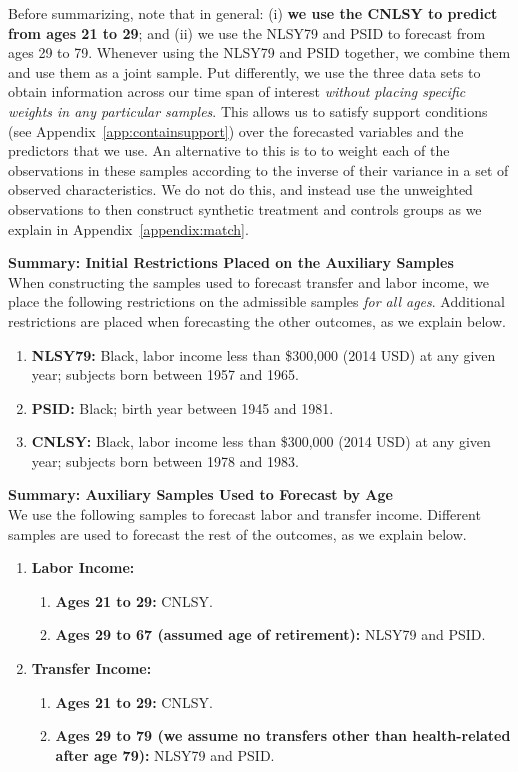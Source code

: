 \noindent Before summarizing, note that in general: (i) \textbf{we use the CNLSY to predict from ages 21 to 29}; and (ii) we use the NLSY79 and PSID to forecast from ages 29 to 79. Whenever using the NLSY79 and PSID together, we combine them and use them as a joint sample. Put differently, we use the three data sets to obtain information across our time span of interest \textit{without placing specific weights in any particular samples}. This allows us to satisfy support conditions (see Appendix~\ref{app:containsupport}) over the forecasted variables and the predictors that we use. An alternative to this is to to weight each of the observations in these samples according to the inverse of their variance in a set of observed characteristics. We do not do this, and instead use the unweighted observations to then construct synthetic treatment and controls groups as we explain in Appendix~\ref{appendix:match}.

\noindent \textbf{Summary: Initial Restrictions Placed on the Auxiliary Samples}\\
When constructing the samples used to forecast transfer and labor income, we place the following restrictions on the admissible samples \textit{for all ages}. Additional restrictions are placed when forecasting the other outcomes, as we explain below.
\begin{enumerate}
\item \textbf{NLSY79:} Black, labor income less than \$300,000 (2014 USD) at any given year; subjects born between 1957 and 1965.
\item \textbf{PSID:} Black; birth year between 1945 and 1981.
\item \textbf{CNLSY:} Black, labor income less than \$300,000 (2014 USD) at any given year; subjects born between 1978 and 1983.
\end{enumerate}

\noindent \textbf{Summary: Auxiliary Samples Used to Forecast by Age}\\
We use the following samples to forecast labor and transfer income. Different samples are used to forecast the rest of the outcomes, as we explain below.
\begin{enumerate}
\item \textbf{Labor Income:}
\begin{enumerate}
\item \textbf{Ages 21 to 29:} CNLSY.
\item \textbf{Ages 29 to 67 (assumed age of retirement):} NLSY79 and PSID.
\end{enumerate}
\item \textbf{Transfer Income:}
\begin{enumerate}
\item \textbf{Ages 21 to 29:} CNLSY.
\item \textbf{Ages 29 to 79 (we assume no transfers other than health-related after age 79):} NLSY79 and PSID.
\end{enumerate}
\end{enumerate}

